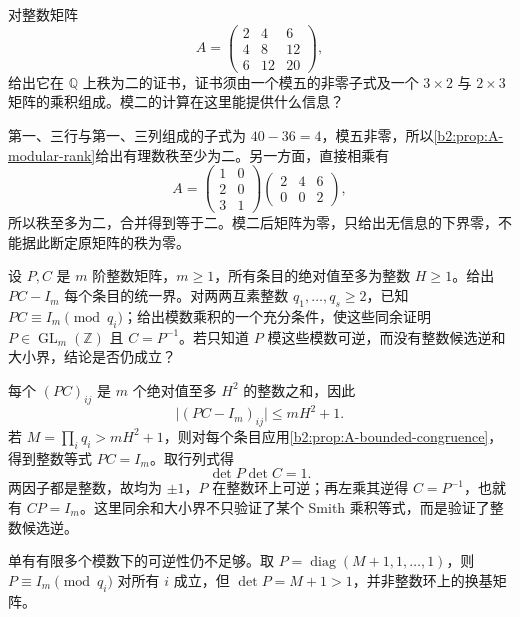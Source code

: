 \begin{exercise}\label{b2:ex:A-modular-rank-certificate}
	对整数矩阵
	\[
		A=\begin{pmatrix}2&4&6\\4&8&12\\6&12&20\end{pmatrix},
	\]
	给出它在 \(\mathbb Q\) 上秩为二的证书，证书须由一个模五的非零子式及一个 \(3\times2\) 与 \(2\times3\) 矩阵的乘积组成。模二的计算在这里能提供什么信息？
\end{exercise}
\begin{solution}
	第一、三行与第一、三列组成的子式为 \(40-36=4\)，模五非零，所以\cref{b2:prop:A-modular-rank}给出有理数秩至少为二。另一方面，直接相乘有
	\[
		A=\begin{pmatrix}1&0\\2&0\\3&1\end{pmatrix}
		\begin{pmatrix}2&4&6\\0&0&2\end{pmatrix},
	\]
	所以秩至多为二，合并得到等于二。模二后矩阵为零，只给出无信息的下界零，不能据此断定原矩阵的秩为零。
\end{solution}

\begin{exercise}\label{b2:ex:A-modular-identity-bound}
	设 \(P,C\) 是 \(m\) 阶整数矩阵，\(m\ge1\)，所有条目的绝对值至多为整数 \(H\ge1\)。给出 \(PC-I_m\) 每个条目的统一界。对两两互素整数 \(q_1,\ldots,q_s\ge2\)，已知 \(PC\equiv I_m\pmod{q_i}\)；给出模数乘积的一个充分条件，使这些同余证明 \(P\in\operatorname{GL}_m(\mathbb Z)\) 且 \(C=P^{-1}\)。若只知道 \(P\) 模这些模数可逆，而没有整数候选逆和大小界，结论是否仍成立？
\end{exercise}
\begin{solution}
	每个 \((PC)_{ij}\) 是 \(m\) 个绝对值至多 \(H^2\) 的整数之和，因此
	\[
		\bigl|(PC-I_m)_{ij}\bigr|\le mH^2+1.
	\]
	若 \(M=\prod_iq_i>mH^2+1\)，则对每个条目应用\cref{b2:prop:A-bounded-congruence}，得到整数等式 \(PC=I_m\)。取行列式得
	\[
		\det P\det C=1.
	\]
	两因子都是整数，故均为 \(\pm1\)，\(P\) 在整数环上可逆；再左乘其逆得 \(C=P^{-1}\)，也就有 \(CP=I_m\)。这里同余和大小界不只验证了某个 Smith 乘积等式，而是验证了整数候选逆。

	单有有限多个模数下的可逆性仍不足够。取 \(P=\operatorname{diag}(M+1,1,\ldots,1)\)，则 \(P\equiv I_m\pmod{q_i}\) 对所有 \(i\) 成立，但 \(\det P=M+1>1\)，并非整数环上的换基矩阵。
\end{solution}

